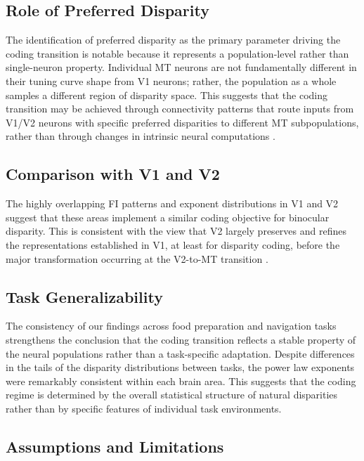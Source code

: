 \documentclass[12pt]{article}
\begin{document}
\subsection{Role of Preferred Disparity}

The identification of preferred disparity as the primary parameter driving the coding transition is notable because it represents a population-level rather than single-neuron property. Individual MT neurons are not fundamentally different in their tuning curve shape from V1 neurons; rather, the population as a whole samples a different region of disparity space. This suggests that the coding transition may be achieved through connectivity patterns that route inputs from V1/V2 neurons with specific preferred disparities to different MT subpopulations, rather than through changes in intrinsic neural computations \citep{movshon1996processing, rust2006signals}.

\subsection{Comparison with V1 and V2}

The highly overlapping FI patterns and exponent distributions in V1 and V2 suggest that these areas implement a similar coding objective for binocular disparity. This is consistent with the view that V2 largely preserves and refines the representations established in V1, at least for disparity coding, before the major transformation occurring at the V2-to-MT transition \citep{cumming2001organization, thomas2002comparison}.

\subsection{Task Generalizability}

The consistency of our findings across food preparation and navigation tasks strengthens the conclusion that the coding transition reflects a stable property of the neural populations rather than a task-specific adaptation. Despite differences in the tails of the disparity distributions between tasks, the power law exponents were remarkably consistent within each brain area. This suggests that the coding regime is determined by the overall statistical structure of natural disparities rather than by specific features of individual task environments.

\subsection{Assumptions and Limitations}
\end{document}
